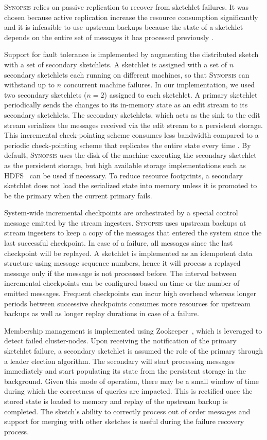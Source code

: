 \textsc{Synopsis} relies on passive replication to recover from sketchlet failures.
It was chosen because active replication increase the resource consumption significantly and it is infeasible to use upstream backups because the state of a sketchlet depends on the entire set of messages it has processed previously \cite{castro2013integrating}.

Support for fault tolerance is implemented by augmenting the distributed sketch with a set of secondary sketchlets.
A sketchlet is assigned with a set of $n$ secondary sketchlets each running on different machines, so that \textsc{Synopsis} can withstand up to $n$ concurrent machine failures.
In our implementation, we used two secondary sketchlets ($n=2$) assigned to each sketchlet.
A primary sketchlet periodically sends the changes to its in-memory state as an edit stream to its secondary sketchlets.
The secondary sketchlets, which acts as the sink to the edit stream serializes the messages received via the edit stream to a persistent storage.
This incremental check-pointing scheme consumes less bandwidth compared to a periodic check-pointing scheme that replicates the entire state every time \cite{castro2013integrating}.
By default, \textsc{Synopsis} uses the disk of the machine executing the secondary sketchlet as the persistent storage, but high available storage implementations such as HDFS~\cite{borthakur2008hdfs} can be used if necessary.
To reduce resource footprints, a secondary sketchlet does not load the serialized state into memory unless it is promoted to be the primary when the current primary fails.

System-wide incremental checkpoints are orchestrated by a special control message emitted by the stream ingesters.
\textsc{Synopsis} uses upstream backups at stream ingesters to keep a copy of the messages that entered the system since the last successful checkpoint.
In case of a failure, all messages since the last checkpoint will be replayed.
A sketchlet is implemented as an idempotent data structure using message sequence numbers, hence it will process a replayed message only if the message is not processed before.
The interval between incremental checkpoints can be configured based on time or the number of emitted messages.
Frequent checkpoints can incur high overhead whereas longer periods between successive checkpoints consumes more resources for upstream backups as well as longer replay durations in case of a failure.

Membership management is implemented using Zookeeper~\cite{hunt2010zookeeper}, which is leveraged to detect failed cluster-nodes.
Upon receiving the notification of the primary sketchlet failure, a secondary sketchlet is assumed the role of the primary through a leader election algorithm.
The secondary will start processing messages immediately and start populating its state from the persistent storage in the background.
Given this mode of operation, there may be a small window of time during which the correctness of queries are impacted.
This is rectified once the stored state is loaded to memory and replay of the upstream backup is completed.
The sketch's ability to correctly process out of order messages and support for merging with other sketches is useful during the failure recovery process.


